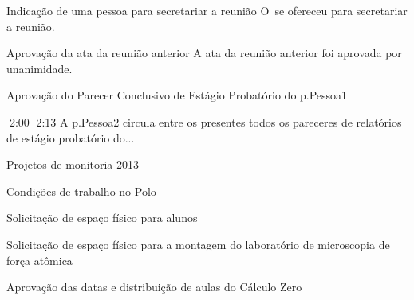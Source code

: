 \documentclass[12pt,a4paper]{ata}
\begin{document}
\begin{ponto}{Indicação de uma pessoa para secretariar a reunião}
  O~\prof \secretariou \space se ofereceu para secretariar a reunião.
\end{ponto}

\begin{ponto}{Aprovação da ata da reunião anterior}
A ata da reunião anterior foi aprovada por unanimidade.
\end{ponto}

\begin{ponto}{Aprovação do Parecer Conclusivo de Estágio Probatório do
  \prof \gls{p.Pessoa1}
}

\T{2:00} \T{2:13} A \profa \gls{p.Pessoa2} circula entre os presentes
todos os pareceres de relatórios de estágio probatório do...

\end{ponto}



\begin{ponto}{Projetos de monitoria 2013}

\dummyText

\end{ponto}

\begin{ponto}{Condições de trabalho no Polo}
	\dummyText
\end{ponto}

\begin{ponto}{Solicitação de espaço físico para alunos}
	\dummyText
\end{ponto}

\begin{ponto}{Solicitação de espaço físico para a montagem do laboratório
    de microscopia de força atômica}
\dummyText
\end{ponto}


\begin{ponto}{Aprovação das datas e distribuição de aulas do Cálculo Zero}
	\dummyText
\end{ponto}
\end{document}
